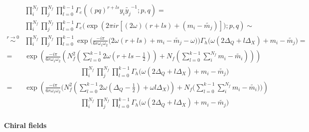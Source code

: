 \begin{appendices}
\begin{equation}
\begin{aligned}
&\prod_i^{N_f} \prod_j^{N_f}  \prod_{l=0}^{k-1} \Gamma_e ( (pq)^{r + l s} y_i \tilde{y_j}^{-1}; p ,q)  = \\
& \prod_i^{N_f} \prod_j^{N_f}  \prod_{l=0}^{k-1} \Gamma_e \big ( \exp \left( 2 \pi i r \left[ (2 \omega)(r + l s) +  ( m_i - \tilde{m_j})\right]); p ,q \right)  \sim \\
\overset{ r\rightarrow 0 }{ \sim } &  \prod_i^{N_f} \prod_j^{N_f}  \prod_{l=0}^{k-1} \exp \bigg( \frac{- i \pi }{6 r \omega_1 \omega_2} \big( 2 \omega ( r + l s ) + m_i - \tilde{m_j} - \omega \big) \bigg) \Gamma_h \big( \omega ( 2 \Delta_Q + l \Delta_X) + m_i - \tilde{m_j} \big)   = \\
= &  \exp \left( \frac{- i \pi }{6 r \omega_1 \omega_2} \left(  N_f^2  \left( \sum _{l=0}^{k-1} 2 \omega ( r + l s - \frac{1}{2}  )\right)  +N_f \left( \sum_{l=0}^{k-1} \sum_i^{N_f} m_i - \tilde{m_i}\right) \right) \right) \\
& \qquad \qquad\qquad \qquad  \prod_i^{N_f} \prod_j^{N_f}  \prod_{l=0}^{k-1}  \Gamma_h \big( \omega ( 2 \Delta_Q + l  \Delta_X) + m_i -  \tilde{m_j} \big)  \\
= &  \exp \left( \frac{- i \pi }{6 r \omega_1 \omega_2} \big(  N_f^2  \left( \sum _{l=0}^{k-1} 2 \omega ( \Delta_Q - \frac{1}{2}) + \omega l \Delta_X   )\right)  +N_f \big( \sum_{l=0}^{k-1} \sum_i^{N_f} m_i - \tilde{m_i}\big) \big) \right) \\
&\qquad \qquad \qquad \qquad \prod_i^{N_f} \prod_j^{N_f}  \prod_{l=0}^{k-1}  \Gamma_h \big( \omega ( 2 \Delta_Q + l \Delta_X) + m_i - \tilde{m_j} \big)
\end{aligned}
\end{equation}

\paragraph{Chiral fields}



\end{appendices}
